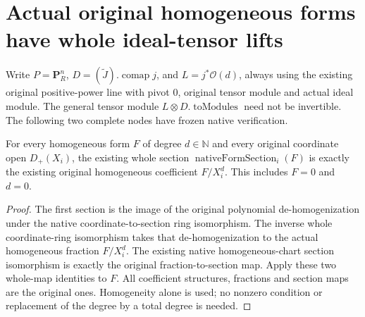 \section{Actual original homogeneous forms have whole ideal-tensor lifts}

Write $P=\mathbf P_R^n$, $D=(\widetilde J).\operatorname{comap}j$,
and $L=j^*\mathcal O(d)$, always using the existing original positive-power
line with pivot $0$, original tensor module and actual ideal module.
The general tensor module $L\otimes D.\operatorname{toModules}$ need not
be invertible.  The following two complete nodes have frozen native verification.

\begin{lemma}
\label{lem:resume-native-form-original-homogeneous-coefficient}
\leanok
For every homogeneous form $F$ of degree $d\in\mathbb N$ and every
original coordinate open $D_+(X_i)$, the existing whole section
$\operatorname{nativeFormSection}_i(F)$ is exactly the existing original
homogeneous coefficient $F/X_i^d$.  This includes $F=0$ and $d=0$.
\end{lemma}
\begin{proof}
The first section is the image of the original polynomial
de-homogenization under the native coordinate-to-section ring
isomorphism.  The inverse whole coordinate-ring isomorphism takes that
de-homogenization to the actual homogeneous fraction $F/X_i^d$.
The existing native homogeneous-chart section isomorphism is exactly
the original fraction-to-section map.  Apply these two whole-map
identities to $F$.  All coefficient structures, fractions and section
maps are the original ones.  Homogeneity alone is used; no nonzero
condition or replacement of the degree by a total degree is needed.
\end{proof}

